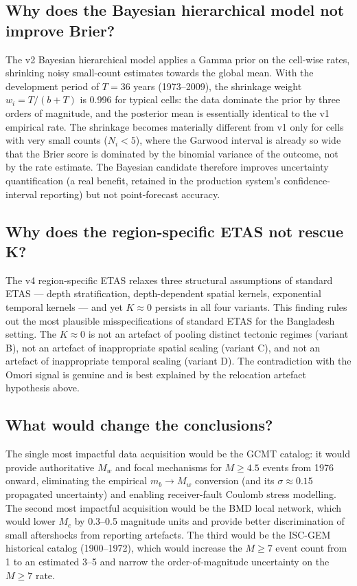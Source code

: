 \documentclass[10pt,a4paper,twocolumn]{article}
\begin{document}
\subsection{Why does the Bayesian hierarchical model not improve Brier?}

The v2 Bayesian hierarchical model applies a Gamma prior on the cell-wise rates, shrinking noisy small-count estimates towards the global mean. With the development period of $T=36$ years (1973--2009), the shrinkage weight $w_i = T/(b+T)$ is 0.996 for typical cells: the data dominate the prior by three orders of magnitude, and the posterior mean is essentially identical to the v1 empirical rate. The shrinkage becomes materially different from v1 only for cells with very small counts ($N_i<5$), where the Garwood interval is already so wide that the Brier score is dominated by the binomial variance of the outcome, not by the rate estimate. The Bayesian candidate therefore improves uncertainty quantification (a real benefit, retained in the production system's confidence-interval reporting) but not point-forecast accuracy.

\subsection{Why does the region-specific ETAS not rescue K?}

The v4 region-specific ETAS relaxes three structural assumptions of standard ETAS --- depth stratification, depth-dependent spatial kernels, exponential temporal kernels --- and yet $K\approx0$ persists in all four variants. This finding rules out the most plausible misspecifications of standard ETAS for the Bangladesh setting. The $K\approx0$ is not an artefact of pooling distinct tectonic regimes (variant B), not an artefact of inappropriate spatial scaling (variant C), and not an artefact of inappropriate temporal scaling (variant D). The contradiction with the Omori signal is genuine and is best explained by the relocation artefact hypothesis above.

\subsection{What would change the conclusions?}

The single most impactful data acquisition would be the GCMT catalog: it would provide authoritative $M_w$ and focal mechanisms for $M\geq4.5$ events from 1976 onward, eliminating the empirical $m_b\to M_w$ conversion (and its $\sigma\approx0.15$ propagated uncertainty) and enabling receiver-fault Coulomb stress modelling. The second most impactful acquisition would be the BMD local network, which would lower $M_c$ by 0.3--0.5 magnitude units and provide better discrimination of small aftershocks from reporting artefacts. The third would be the ISC-GEM historical catalog (1900--1972), which would increase the $M\geq7$ event count from 1 to an estimated 3--5 and narrow the order-of-magnitude uncertainty on the $M\geq7$ rate.
\end{document}
